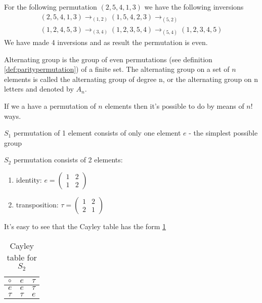 \begin{appendices}
\begin{example}
  For the following permutation $(2,5,4,1,3)$ we have the following
  inversions
  \begin{eqnarray}
    (2,5,4,1,3) \to_{(1,2)}
    (1,5,4,2,3) \to_{(5,2)}
    \nonumber \\
    (1,2,4,5,3) \to_{(3,4)}
    (1,2,3,5,4) \to_{(5,4)}
    (1,2,3,4,5)
    \nonumber
  \end{eqnarray}
  We have made 4 inversions and as result the permutation is even.
  \label{ex:paritypermutation}
\end{example}

\begin{definition}
  Alternating group \cite{wiki:alteringgroup} is the group of even
  permutations (see definition \ref{def:paritypermutation}) of a finite 
  set. The alternating group on a set of $n$ elements is called the
  alternating group of degree n, or the alternating group on n letters
  and denoted by $A_n$.
  \label{def:alternatinggroup}
\end{definition}

\begin{example}[$S_n$ group]
  If we a have a permutation of $n$ elements then it's possible to do
  by means of $n!$ ways.
  \label{ex:sngroup}
\end{example}

\begin{example}[$S_1$ group]
  $S_1$ permutation of 1 element consists of only one element $e$ -
  the simplest possible group
  \label{ex:s1group}
\end{example}

\begin{example}[$S_2$ group]
  $S_2$ permutation consists of 2 elements:
  \begin{enumerate}
  \item identity:
    \(
    e = \begin{pmatrix}
      1 & 2 \\
      1 & 2
    \end{pmatrix}
    \) 
  \item transposition:
    \(
    \tau = \begin{pmatrix}
      1 & 2 \\
      2 & 1
    \end{pmatrix}
    \) 
  \end{enumerate}
  It's easy to see that the Cayley table has the form \ref{tab:CayleyS2}
    \begin{table}
    \centering
    \caption{Cayley table for $S_2$}
    \label{tab:CayleyS2}
    \begin{tabular}{l|ll}
      \toprule
      $\circ$ & $e$ & $\tau$ \\
      \midrule
      $e$ & $e$ & $\tau$ \\
      $\tau$ & $\tau$ & $e$ \\
      \bottomrule
    \end{tabular}
    \end{table}
  \label{ex:s2group}
\end{example}


\end{appendices}
